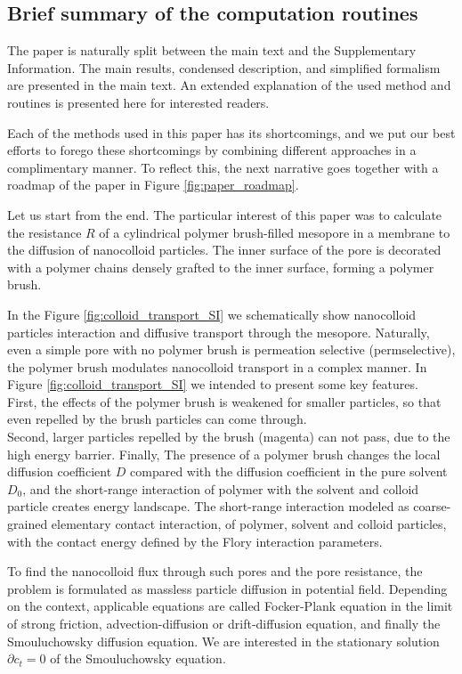 \documentclass[10pt, a4paper]{article}
\begin{document}
\subsection*{Brief summary of the computation routines}
\begin{multicols}{2}

The paper is naturally split between the main text and the Supplementary Information. 
The main results, condensed description, and simplified formalism are presented in the main text.
An extended explanation of the used method and routines is presented here for interested readers. 

Each of the methods used in this paper has its shortcomings, and we put our best efforts to forego these shortcomings by combining different approaches in a complimentary manner. 
To reflect this, the next narrative goes together with a roadmap of the paper in Figure \ref{fig:paper_roadmap}.

Let us start from the end. 
The particular interest of this paper was to calculate the resistance $R$ of a cylindrical polymer brush-filled mesopore in a membrane to the diffusion of nanocolloid particles. 
The inner surface of the pore is decorated with a polymer chains densely grafted to the inner surface, forming a polymer brush.

In the Figure \ref{fig:colloid_transport_SI} we schematically show nanocolloid particles interaction and diffusive transport through the mesopore.
Naturally, even a simple pore with no polymer brush is permeation selective (permselective), the polymer brush modulates nanocolloid transport in a complex manner.
In Figure \ref{fig:colloid_transport_SI} we intended to present some key features.
\\
First, the effects of the polymer brush is weakened for smaller particles, so that even repelled by the brush particles can come through.
\\
Second, larger particles repelled by the brush (magenta) can not pass, due to the high energy barrier.
Finally, The presence of a polymer brush changes the local diffusion coefficient $D$ compared with the diffusion coefficient in the pure solvent $D_0$, and the short-range interaction of polymer with the solvent and colloid particle creates energy landscape.
The short-range interaction modeled as coarse-grained elementary contact interaction, of polymer, solvent and colloid particles, with the contact energy defined by the Flory interaction parameters.

To find the nanocolloid flux through such pores and the pore resistance, the problem is formulated as massless particle diffusion in potential field.
Depending on the context, applicable equations are called Focker-Plank equation in the limit of strong friction, advection-diffusion or drift-diffusion equation, and finally the Smouluchowsky diffusion equation.
We are interested in the stationary solution $\partial c_t = 0$ of the Smouluchowsky equation.


\end{multicols}
\end{document}
